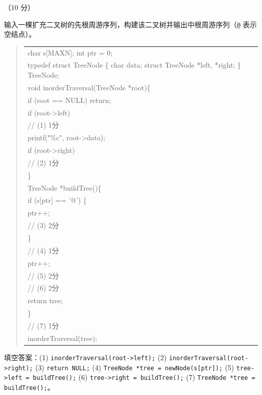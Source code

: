 \begin{question}[二叉树构建与中序遍历]（10 分）

输入一棵扩充二叉树的先根周游序列，构建该二叉树并输出中根周游序列（\texttt{@} 表示空结点）。

\begin{quote}
\footnotesize
\begin{tabular}{@{}l@{}}
char s[MAXN]; int ptr = 0;\\
typedef struct TreeNode \{ char data; struct TreeNode *left, *right; \} TreeNode;\\
void inorderTraversal(TreeNode *root)\{\\
    if (root == NULL) return;\\
    if (root->left)\\
\underline{\hspace{12em}} // (1) 1分\\
    printf("\%c", root->data);\\
    if (root->right)\\
\underline{\hspace{12em}} // (2) 1分\\
\}\\
TreeNode *buildTree()\{\\
    if (s[ptr] == '@') \{\\
        ptr++;\\
\underline{\hspace{12em}} // (3) 2分\\
    \}\\
\underline{\hspace{12em}} // (4) 1分\\
    ptr++;\\
\underline{\hspace{12em}} // (5) 2分\\
\underline{\hspace{12em}} // (6) 2分\\
    return tree;\\
\}\\
\underline{\hspace{12em}} // (7) 1分\\
inorderTraversal(tree);\\
\end{tabular}
\end{quote}

\begin{solution}
填空答案：(1) \texttt{inorderTraversal(root->left);} (2) \texttt{inorderTraversal(root->right);} (3) \texttt{return NULL;} (4) \texttt{TreeNode *tree = newNode(s[ptr]);} (5) \texttt{tree->left = buildTree();} (6) \texttt{tree->right = buildTree();} (7) \texttt{TreeNode *tree = buildTree();}。
\end{solution}
\end{question}

\clearpage

